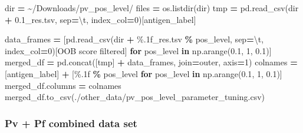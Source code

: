 \documentclass[
  11pt,
  oneside]{book}
\newenvironment{Shaded}{\begin{snugshade}}{\end{snugshade}}
\newcommand{\BuiltInTok}[1]{#1}
\newcommand{\CharTok}[1]{\textcolor[rgb]{0.31,0.60,0.02}{#1}}
\newcommand{\ControlFlowTok}[1]{\textcolor[rgb]{0.13,0.29,0.53}{\textbf{#1}}}
\newcommand{\DecValTok}[1]{\textcolor[rgb]{0.00,0.00,0.81}{#1}}
\newcommand{\FloatTok}[1]{\textcolor[rgb]{0.00,0.00,0.81}{#1}}
\newcommand{\KeywordTok}[1]{\textcolor[rgb]{0.13,0.29,0.53}{\textbf{#1}}}
\newcommand{\NormalTok}[1]{#1}
\newcommand{\OperatorTok}[1]{\textcolor[rgb]{0.81,0.36,0.00}{\textbf{#1}}}
\newcommand{\SpecialCharTok}[1]{\textcolor[rgb]{0.00,0.00,0.00}{#1}}
\newcommand{\StringTok}[1]{\textcolor[rgb]{0.31,0.60,0.02}{#1}}
\begin{document}
\begin{Shaded}
\begin{Highlighting}[]
\BuiltInTok{dir} \OperatorTok{=} \StringTok{\textquotesingle{}\textasciitilde{}/Downloads/pv\_pos\_level/\textquotesingle{}}
\NormalTok{files }\OperatorTok{=}\NormalTok{ os.listdir(}\BuiltInTok{dir}\NormalTok{)}
\NormalTok{tmp }\OperatorTok{=}\NormalTok{ pd.read\_csv(}\BuiltInTok{dir} \OperatorTok{+} \StringTok{\textquotesingle{}0.1\_res.tsv\textquotesingle{}}\NormalTok{, sep}\OperatorTok{=}\StringTok{\textquotesingle{}}\CharTok{\textbackslash{}t}\StringTok{\textquotesingle{}}\NormalTok{, index\_col}\OperatorTok{=}\DecValTok{0}\NormalTok{)[}\StringTok{\textquotesingle{}antigen\_label\textquotesingle{}}\NormalTok{]}

\NormalTok{data\_frames }\OperatorTok{=}\NormalTok{ [pd.read\_csv(}\BuiltInTok{dir} \OperatorTok{+} \StringTok{\textquotesingle{}}\SpecialCharTok{\%.1f}\StringTok{\_res.tsv\textquotesingle{}} \OperatorTok{\%}\NormalTok{ pos\_level, sep}\OperatorTok{=}\StringTok{\textquotesingle{}}\CharTok{\textbackslash{}t}\StringTok{\textquotesingle{}}\NormalTok{, index\_col}\OperatorTok{=}\DecValTok{0}\NormalTok{)[}\StringTok{\textquotesingle{}OOB score filtered\textquotesingle{}}\NormalTok{] }\ControlFlowTok{for}\NormalTok{ pos\_level }\KeywordTok{in}\NormalTok{ np.arange(}\FloatTok{0.1}\NormalTok{, }\DecValTok{1}\NormalTok{, }\FloatTok{0.1}\NormalTok{)]}
\NormalTok{merged\_df }\OperatorTok{=}\NormalTok{ pd.concat([tmp] }\OperatorTok{+}\NormalTok{ data\_frames, join}\OperatorTok{=}\StringTok{\textquotesingle{}outer\textquotesingle{}}\NormalTok{, axis}\OperatorTok{=}\DecValTok{1}\NormalTok{)}
\NormalTok{colnames }\OperatorTok{=}\NormalTok{ [}\StringTok{\textquotesingle{}antigen\_label\textquotesingle{}}\NormalTok{] }\OperatorTok{+}\NormalTok{ [}\StringTok{\textquotesingle{}}\SpecialCharTok{\%.1f}\StringTok{\textquotesingle{}} \OperatorTok{\%}\NormalTok{ pos\_level }\ControlFlowTok{for}\NormalTok{ pos\_level }\KeywordTok{in}\NormalTok{ np.arange(}\FloatTok{0.1}\NormalTok{, }\DecValTok{1}\NormalTok{, }\FloatTok{0.1}\NormalTok{)]}
\NormalTok{merged\_df.columns }\OperatorTok{=}\NormalTok{ colnames}
\NormalTok{merged\_df.to\_csv(}\StringTok{\textquotesingle{}./other\_data/pv\_pos\_level\_parameter\_tuning.csv\textquotesingle{}}\NormalTok{)}
\end{Highlighting}
\end{Shaded}

\hypertarget{pv-pf-combined-data-set}{%
\subsubsection{Pv + Pf combined data set}\label{pv-pf-combined-data-set}}
\end{document}
